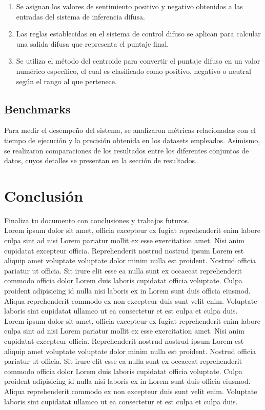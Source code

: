 \documentclass[sigconf, review=false, nonacm]{acmart}
\begin{document}
\begin{enumerate}
	\item Se asignan los valores de sentimiento positivo y negativo obtenidos a las entradas del sistema de
	      inferencia difusa.
	\item Las reglas establecidas en el sistema de control difuso se aplican para calcular una salida difusa
	      que representa el puntaje final.
	\item Se utiliza el método del centroide para convertir el puntaje difuso en un valor numérico específico,
	      el cual es clasificado como positivo, negativo o neutral según el rango al que pertenece.
\end{enumerate}


\subsection{Benchmarks}
Para medir el desempeño del sistema, se analizaron métricas relacionadas
con el tiempo de ejecución y la precisión obtenida en los datasets empleados.
Asimismo, se realizaron comparaciones de los resultados entre los diferentes conjuntos de datos,
cuyos detalles se presentan en la sección de resultados.

\section{Conclusión}
Finaliza tu documento con conclusiones y trabajos futuros.\\

Lorem ipsum dolor sit amet, officia excepteur ex fugiat reprehenderit enim labore culpa sint ad nisi Lorem
pariatur mollit ex esse exercitation amet. Nisi anim cupidatat excepteur officia. Reprehenderit nostrud
nostrud ipsum Lorem est aliquip amet voluptate voluptate dolor minim nulla est proident. Nostrud officia
pariatur ut officia. Sit irure elit esse ea nulla sunt ex occaecat reprehenderit commodo officia dolor Lorem
duis laboris cupidatat officia voluptate. Culpa proident adipisicing id nulla nisi laboris ex in Lorem sunt
duis officia eiusmod. Aliqua reprehenderit commodo ex non excepteur duis sunt velit enim. Voluptate laboris
sint cupidatat ullamco ut ea consectetur et est culpa et culpa duis.\\

Lorem ipsum dolor sit amet, officia excepteur ex fugiat reprehenderit enim labore culpa sint ad nisi Lorem
pariatur mollit ex esse exercitation amet. Nisi anim cupidatat excepteur officia. Reprehenderit nostrud
nostrud ipsum Lorem est aliquip amet voluptate voluptate dolor minim nulla est proident. Nostrud officia
pariatur ut officia. Sit irure elit esse ea nulla sunt ex occaecat reprehenderit commodo officia dolor Lorem
duis laboris cupidatat officia voluptate. Culpa proident adipisicing id nulla nisi laboris ex in Lorem sunt
duis officia eiusmod. Aliqua reprehenderit commodo ex non excepteur duis sunt velit enim. Voluptate laboris
sint cupidatat ullamco ut ea consectetur et est culpa et culpa duis.

\nocite{libro}


\end{document}
